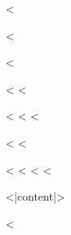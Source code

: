 <%

<%
\usepackage{indentfirst}
<%

<%
\doublespacing
\setlength{\parindent}{1.27cm}
<%

<%
<%
<%
\date{<|settings.date|>}
<%
<%

<%
<%
\pagebreak
<%
<%

<|content|>

\printbibliography

<%
